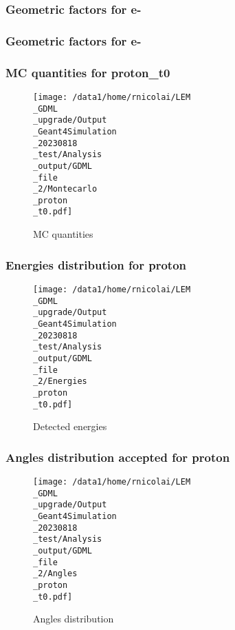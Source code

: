 \documentclass[8pt]{beamer}
\begin{document}
            \begin{frame}
                \frametitle{Geometric factors for e-}
            
            \end{frame}
            
            \begin{frame}
                \frametitle{Geometric factors for e-}
            
            \end{frame}
            
            \begin{frame}
                \frametitle{MC quantities for proton\_t0}
            
        \begin{figure}[h]
            \centering
            \texttt{[image: /data1/home/rnicolai/LEM\\\_GDML\\\_upgrade/Output\\\_Geant4Simulation\\\_20230818\\\_test/Analysis\\\_output/GDML\\\_file\\\_2/Montecarlo\\\_proton\\\_t0.pdf]}
            \caption{MC quantities}
        \end{figure}
        
            \end{frame}
            
            \begin{frame}
                \frametitle{Energies distribution for proton}
            
        \begin{figure}[h]
            \centering
            \texttt{[image: /data1/home/rnicolai/LEM\\\_GDML\\\_upgrade/Output\\\_Geant4Simulation\\\_20230818\\\_test/Analysis\\\_output/GDML\\\_file\\\_2/Energies\\\_proton\\\_t0.pdf]}
            \caption{Detected energies}
        \end{figure}
        
            \end{frame}
            
            \begin{frame}
                \frametitle{Angles distribution accepted for proton}
            
        \begin{figure}[h]
            \centering
            \texttt{[image: /data1/home/rnicolai/LEM\\\_GDML\\\_upgrade/Output\\\_Geant4Simulation\\\_20230818\\\_test/Analysis\\\_output/GDML\\\_file\\\_2/Angles\\\_proton\\\_t0.pdf]}
            \caption{Angles distribution}
        \end{figure}
        
            \end{frame}
            
\end{document}
